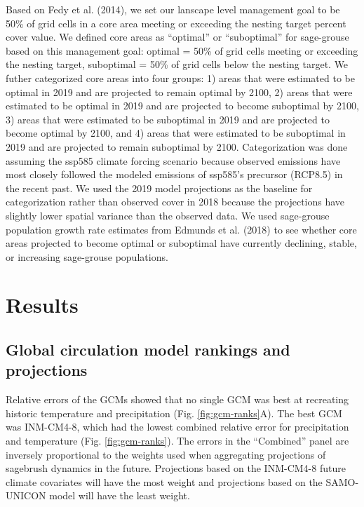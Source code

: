 \documentclass[
  12pt,
]{article}
\begin{document}
Based on Fedy et al. (2014), we set our lanscape level management goal to be 50\% of grid cells in a core area meeting or exceeding the nesting target percent cover value.
We defined core areas as ``optimal'' or ``suboptimal'' for sage-grouse based on this management goal: optimal = 50\% of grid cells meeting or exceeding the nesting target, suboptimal = 50\% of grid cells below the nesting target.
We futher categorized core areas into four groups: 1) areas that were estimated to be optimal in 2019 and are projected to remain optimal by 2100, 2) areas that were estimated to be optimal in 2019 and are projected to become suboptimal by 2100, 3) areas that were estimated to be suboptimal in 2019 and are projected to become optimal by 2100, and 4) areas that were estimated to be suboptimal in 2019 and are projected to remain suboptimal by 2100.
Categorization was done assuming the ssp585 climate forcing scenario because observed emissions have most closely followed the modeled emissions of ssp585's precursor (RCP8.5) in the recent past.
We used the 2019 model projections as the baseline for categorization rather than observed cover in 2018 because the projections have slightly lower spatial variance than the observed data.
We used sage-grouse population growth rate estimates from Edmunds et al. (2018) to see whether core areas projected to become optimal or suboptimal have currently declining, stable, or increasing sage-grouse populations.

\hypertarget{results}{%
\section{Results}\label{results}}

\hypertarget{global-circulation-model-rankings-and-projections}{%
\subsection{Global circulation model rankings and projections}\label{global-circulation-model-rankings-and-projections}}

Relative errors of the GCMs showed that no single GCM was best at recreating historic temperature and precipitation (Fig. \ref{fig:gcm-ranks}A).
The best GCM was INM-CM4-8, which had the lowest combined relative error for precipitation and temperature (Fig. \ref{fig:gcm-ranks}).
The errors in the ``Combined'' panel are inversely proportional to the weights used when aggregating projections of sagebrush dynamics in the future.
Projections based on the INM-CM4-8 future climate covariates will have the most weight and projections based on the SAMO-UNICON model will have the least weight.
\end{document}
